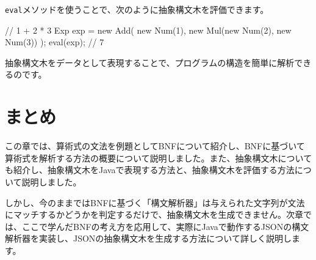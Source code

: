 \texttt{eval}メソッドを使うことで、次のように抽象構文木を評価できます。

\begin{codescreen}{}
// 1 + 2 * 3
Exp exp = new Add(
  new Num(1), new Mul(new Num(2), new Num(3))
);
eval(exp); // 7
\end{codescreen}


抽象構文木をデータとして表現することで、プログラムの構造を簡単に解析できるのです。

\section{まとめ}

この章では、算術式の文法を例題としてBNFについて紹介し、BNFに基づいて算術式を解析する方法の概要について説明しました。また、抽象構文木についても紹介し、抽象構文木をJavaで表現する方法と、抽象構文木を評価する方法について説明しました。

しかし、今のままではBNFに基づく「構文解析器」は与えられた文字列が文法にマッチするかどうかを判定するだけで、抽象構文木を生成できません。次章では、ここで学んだBNFの考え方を応用して、実際にJavaで動作するJSONの構文解析器を実装し、JSONの抽象構文木を生成する方法について詳しく説明します。

